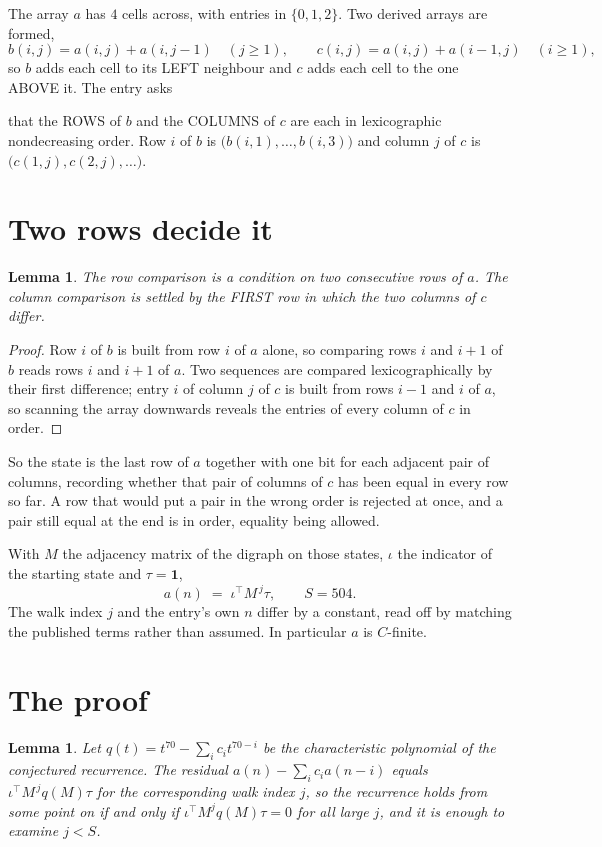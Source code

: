 \documentclass[11pt,a4paper]{article}
\theoremstyle{plain}
\newtheorem{lemma}[theorem]{Lemma}
\theoremstyle{definition}
\begin{document}
The array $a$ has $4$ cells across, with entries in $\{0,1,2\}$. Two derived arrays are formed,
\[
b(i,j)=a(i,j)+a(i,j-1)\quad(j\ge1),\qquad c(i,j)=a(i,j)+a(i-1,j)\quad(i\ge1),
\]
so $b$ adds each cell to its LEFT neighbour and $c$ adds each cell to the one ABOVE it. The
entry asks

that the ROWS of $b$ and the COLUMNS of $c$ are each in lexicographic nondecreasing order. Row $i$ of $b$
is $\bigl(b(i,1),\dots,b(i,3)\bigr)$ and column $j$ of $c$ is
$\bigl(c(1,j),c(2,j),\dots\bigr)$.


\section{Two rows decide it}

\begin{lemma}\label{lem:win}
The row comparison is a condition on two consecutive rows of $a$. The column comparison is
settled by the FIRST row in which the two columns of $c$ differ.
\end{lemma}

\begin{proof}
Row $i$ of $b$ is built from row $i$ of $a$ alone, so comparing rows $i$ and $i+1$ of $b$ reads
rows $i$ and $i+1$ of $a$. Two sequences are compared lexicographically by their first
difference; entry $i$ of column $j$ of $c$ is built from rows $i-1$ and $i$ of $a$, so scanning
the array downwards reveals the entries of every column of $c$ in order.
\end{proof}

So the state is the last row of $a$ together with one bit for each adjacent pair of columns,
recording whether that pair of columns of $c$ has been equal in every row so far. A row that
would put a pair in the wrong order is rejected at once, and a pair still equal at the end is
in order, equality being allowed.

With $M$ the adjacency matrix of the digraph on those states, $\iota$ the indicator of the
starting state and $\tau=\mathbf{1}$,
\[
a(n)\;=\;\iota^{\!\top}M^{\,j}\tau ,\qquad S=504.
\]
The walk index $j$ and the entry's own $n$ differ by a constant, read off by matching the
published terms rather than assumed. In particular $a$ is $C$-finite.

\section{The proof}

\begin{lemma}\label{lem:crit}
Let $q(t)=t^{70}-\sum_i c_it^{70-i}$ be the characteristic polynomial of the
conjectured recurrence. The residual $a(n)-\sum_ic_ia(n-i)$ equals
$\iota^{\!\top}M^{\,j}q(M)\tau$ for the corresponding walk index $j$, so the recurrence
holds from some point on if and only if $\iota^{\!\top}M^{j}q(M)\tau=0$ for all large $j$,
and it is enough to examine $j<S$.
\end{lemma}
\end{document}
